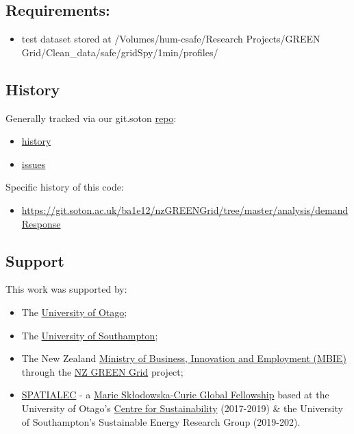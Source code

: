 \documentclass[]{article}
\providecommand{\tightlist}{%
  \setlength{\itemsep}{0pt}\setlength{\parskip}{0pt}}
\begin{document}
\subsection{Requirements:}\label{requirements}

\begin{itemize}
\tightlist
\item
  test dataset stored at /Volumes/hum-csafe/Research Projects/GREEN
  Grid/Clean\_data/safe/gridSpy/1min/profiles/
\end{itemize}

\subsection{History}\label{history}

Generally tracked via our git.soton
\href{https://git.soton.ac.uk/ba1e12/nzGREENGrid}{repo}:

\begin{itemize}
\tightlist
\item
  \href{https://git.soton.ac.uk/ba1e12/nzGREENGrid/commits/master}{history}
\item
  \href{https://git.soton.ac.uk/ba1e12/nzGREENGrid/issues}{issues}
\end{itemize}

Specific history of this code:

\begin{itemize}
\tightlist
\item
  \url{https://git.soton.ac.uk/ba1e12/nzGREENGrid/tree/master/analysis/demandResponse}
\end{itemize}

\subsection{Support}\label{support}

This work was supported by:

\begin{itemize}
\tightlist
\item
  The \href{https://www.otago.ac.nz/}{University of Otago};
\item
  The \href{https://www.southampton.ac.uk/}{University of Southampton};
\item
  The New Zealand \href{http://www.mbie.govt.nz/}{Ministry of Business,
  Innovation and Employment (MBIE)} through the
  \href{https://www.otago.ac.nz/centre-sustainability/research/energy/otago050285.html}{NZ
  GREEN Grid} project;
\item
  \href{http://www.energy.soton.ac.uk/tag/spatialec/}{SPATIALEC} - a
  \href{http://ec.europa.eu/research/mariecurieactions/about-msca/actions/if/index_en.htm}{Marie
  Skłodowska-Curie Global Fellowship} based at the University of Otago's
  \href{http://www.otago.ac.nz/centre-sustainability/staff/otago673896.html}{Centre
  for Sustainability} (2017-2019) \& the University of Southampton's
  Sustainable Energy Research Group (2019-202).
\end{itemize}
\end{document}

